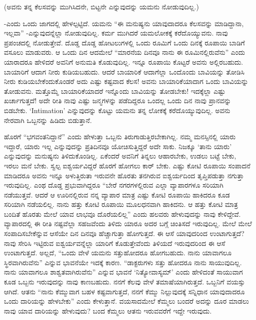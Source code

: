 (ಅವನು ತನ್ನ ಕೆಲಸವನ್ನು ಮುಗಿಸಿದನೇ, ಬಿಟ್ಟನೇ ಎನ್ನುವುದನ್ನು ಯಮನು ನೋಡುವುದಿಲ್ಲ.)

-ಎಂದು ಒಂದು ಜಾಗದಲ್ಲಿ ಹೇಳಲ್ಪಟ್ಟಿದೆ. ಯಮನು ``ಈ ಮನುಷ್ಯನು ಯಾವುದಾದರೂ ಕೆಲಸವನ್ನು ಮಾಡಿದ್ದಾನಾ, ಇಲ್ಲವಾ'' -ಎನ್ನುವುದನ್ನೆಲ್ಲಾ ನೋಡುವುದಿಲ್ಲ. ಕರ್ಮ ಮುಗಿದರೆ ಯಮಲೋಕಕ್ಕೆ ಕರೆದೊಯ್ಯುವನು. ನಾವು ಪ್ರಪಂಚದಲ್ಲಿ ನೋಡುತ್ತೇವೆ. ದೊಡ್ಡ ದೊಡ್ಡ ಹೋಟಲುಗಳಲ್ಲಿ ಒಂದು ರೂಮಿಗೆ ಒಂದು ದಿನಕ್ಕೆ {} ರೂಪಾಯಿ ಬಾಡಿಗೆ ವಸೂಲು ಮಾಡುವರು. ಆ ಒಂದು ದಿನ ಆದಮೇಲೆ ``ಮಾರನೆಯ ದಿನವೂ ನಾನು ಈ ರೂಮಿನಲ್ಲಿರುವೆನು'' ಎಂದು ಯಾರಾದರೂ ಹೇಳಿದರೆ ಅವನಿಗೆ ಅನುಮತಿ ಕೊಡುವುದಿಲ್ಲ. ಇನ್ನೂ {} ರೂಪಾಯಿ ಕೊಟ್ಟರೆ ಅವನು ಅಲ್ಲಿರಬಹುದು. ಬಾಯಾರಿಗೆ ಆದಾಗ ನೀರು ಕುಡಿಯಬಹುದು. ಆದರೆ ಬಾಯಾರಿಕೆ ಆದಾಗೆಲ್ಲಾ ಒಂದೊಂದು ಬಾವಿಯನ್ನು ತೋಡಿಸಿ ನೀರು ಕುಡಿಯಬೇಕೆಂದುಕೊಂಡರೆ ಅದು ಎಷ್ಟು ಕಷ್ಟವಾದ ಕೆಲಸ! ಅವನು ಬಾಯಾರಿಕೆಯಾದಾಗ ಒಂದು ಬಾವಿಯನ್ನು ತೋಡುವನು. ಮತ್ತೊಮ್ಮೆ ಬಾಯಾರಿಕೆಯಾದರೆ ಇನ್ನೊಂದು ಬಾವಿಯನ್ನು ತೋಡಬೇಕು! ಇದಕ್ಕೆಲ್ಲಾ ಎಷ್ಟು ಖರ್ಚಾಗುತ್ತದೆ! ಅದೇ ರೀತಿ ನಾವು ಎಷ್ಟು ಜನ್ಮಗಳನ್ನು ಪಡೆದಿದ್ದರೂ ಒಂದಲ್ಲ ಒಂದು ದಿನ ನಾವು ಪ್ರಾನವನ್ನು ಬಿಡಬೇಕು. `{\eng Intimation}' ಎನ್ನುವುದನ್ನು ಕೊಟ್ಟು ಯಮನು ತನ್ನ ಲೋಕಕ್ಕೆ ಕರೆದೊಯ್ಯುವುದಿಲ್ಲ. ಅವನು ನೇರವಾಗಿ ಒಬ್ಬನನ್ನು ಹಿಡಿದು ಬಿಡುತ್ತಾನೆ.

ಹೊರಗೆ ``ಭಗವಂತನಿದ್ದಾನೆ'' ಎಂದು ಹೇಳುತ್ತಾ ಒಬ್ಬನು ತಿರುಗಾಡುತ್ತಿರಬೇಕಾಗಿಲ್ಲ. ನಮ್ಮ ಮನಸ್ಸಿನಲ್ಲಿ ಯಾರು ಇದ್ದಾರೆ, ಯಾರು ಇಲ್ಲ ಎನ್ನುವುದನ್ನು ಪ್ರತಿದಿನವೂ ಯೋಚಿಸುತ್ತಿದ್ದರೆ ಅದೇ ಸಾಕು. ನಿಜಕ್ಕೂ `ತಾನು ಯಾರು' ಎನ್ನುವುದನ್ನು ಮನುಷ್ಯನು ತಿಳಿದುಕೊಂಡಿಲ್ಲ. ಏಕೆಂದರೆ ಅವನಿಗೆ ತಿನ್ನಲು ಆಹಾರಬೇಕು, ಉಡಲು ಬಟ್ಟೆ ಬೇಕು, ಇರಲು ಮನೆ ಬೇಕು. ಸ್ವಲ್ಪ ಐಶ್ವರ್ಯವಿದ್ದರೆ ಹೊರಗೆ ಹೋಗಲು ಕಾರ್ ಬೇಕು. ಎಷ್ಟು ಕೋಟಿ ರೂಪಾಯಿ ಸಂಪಾದನೆ ಮಾಡಿದರೂ ಅವನು ಇನ್ನೂ ಅಳುತ್ತಿರುತಾ ಇರುವನೇ ಹೊರತು ತನಗಿರುವ ಐಶ್ವರ್ಯದಿಂದ ತೃಪ್ತಿಪಡುತ್ತಾ ನಗುತ್ತಾ ಇರುವುದಿಲ್ಲ. ಎಂಥ ದೊಡ್ಡ ಪ್ರಭುವಾಗಿದ್ದರೂ ``ಬೇರೆ ನಗರಗಳಲ್ಲಿರುವ ಎಲ್ಲಾ ವ್ಯಾಪಾರಗಳೂ ಸರಿಯಾಗಿ ನಡೆಯುತ್ತವೆ. ಆದರೆ ಆ ಊರಿನಲ್ಲಿರುವ ನನ್ನ ವ್ಯಾಪಾರ ಮಾತ್ರ ಎಷ್ಟು ಕೋಟಿ ರೂಪಾಯಿ ಹಾಕಿದರೂ ಕೂಡ ಸರಿಯಾಗಿ ನಡೆಯಲಿಲ್ಲ. ನಾನು ಹತ್ತು ಕೋಟಿ ರೂಪಾಯಿ ಮೂಲಧನವಾಗಿ ಹಾಕಿದನು. ಆ ಹತ್ತು ಕೋಟಿ ಮಾತ್ರ ಬಂದಿತೆ ಹೊರತು ಮೇಲೆ ಯಾವ ಲಾಭವೂ ದೊರೆಯಲಿಲ್ಲ'' ಎಂದು ಹಲವರು ಹೇಳುವುದನ್ನು ನಾವು ಕೇಳಿದ್ದೇವೆ. ವ್ಯಾಪಾರದಲ್ಲಿ ಈ ರೀತಿ ನಷ್ಟವೆಲ್ಲಾ ಸಹಜವೆಂದು ತಿಳಿದು ಯಾರೂ ಅದರ ಬಗ್ಗೆ ಚಿಂತಿಸದೆ ಇರುವುದಿಲ್ಲ. ಮೇಲೆ ಮೇಲೆ ಸಂಪಾದಿಸಬೇಕೆನ್ನುವ ಆಸೆಯೇ ದಿನ ದಿನವೂ ಹೆಚ್ಚಾಗುತ್ತಾ ಹೋಗುತ್ತದೆ. ಈ ಆಸೆ ಯಾವುದರಿಂದ ಉಂಟಾಗುತ್ತದೆ? ನಾವು ಸೇರಿಸಿ ಇಟ್ಟಿರುವ ಐಶ್ವರ್ಯವನ್ನೆಲ್ಲಾ ಯಾರಿಗೆ ಕೊಡುತ್ತೇವೆಂದು ತಿಳಿಯದೆ ಇರುವುದರಿಂದ ಈ ಆಸೆ ಉಂಟಾಗುತ್ತದೆ. ಅಲ್ಲದೆ, ``ಒಂದು ವೇಳೆ ಯಮನು ಸತ್ತುಹೋದರೂ ಹೋಗಬಹುದು. ನಾನು ಯಾವಾಗಲೂ ಸ್ಥಿರವಾಗಿರುವೆನು'' ಎನ್ನುವ ಭಾವನೆಯೇ ಇದಕ್ಕೆ ಕಾರಣ. ``ಡಾಕ್ಟರುಗಳು ಸತ್ತು ಹೋದರೂ ನಾನು ಸಾಯುವುದಿಲ್ಲ. ನಾನು ಯಾವಾಗಲೂ ಶಾಶ್ವತವಾಗಿರುವೆನು'' ಎನ್ನುವ ಭಾವನೆ `ನಿತ್ಯೋವಾಸ್ಯಮ್' ಎಂದು ಹೇಳಿದಂತೆ ಸಾಯುವಾಗ ಕೂಡ ಒಬ್ಬನು ಇರುವುದನ್ನು ನಾವು ಕಾಣಬಹುದು. ನನಗೆ ಕೆಲವು ವೇಳೆ ತಮಾಷೆಯಾಗಿರುತ್ತದೆ. ಒಬ್ಬನಿಗೆ {} ವಯಸ್ಸು ಆಗಿದೆ. ಆತನು ``ನಾನು ಕೆಮ್ಮುವಾಗ ಬಹಳ ಕಷ್ಟವಾಗುತ್ತದೆ, ನನಗೆ ಕೆಮ್ಮು ನಿಲ್ಲುವುದಕ್ಕೆ ಸನ್ನಿಧಾನ ಯಾವುದಾದರೂ ಒಂದು ದಾರಿಯನ್ನು ಹೇಳಬೇಕು'' ಎಂದು ಕೇಳುತ್ತಾನೆ. {} ವಯಸಾದಮೇಲೆ ಕೆಮ್ಮಲು ಬಂದರೆ ಅದನ್ನು ದೂರ ಮಾಡಲು ನಾವು ಯಾವ ದಾರಿಯನ್ನು ಹೇಳುವುದು? ಬಂದ ಕೆಮ್ಮಲು ಆತನು ಇರುವವರೆಗೆ ಇದ್ದೇ ಇರುವುದು.

